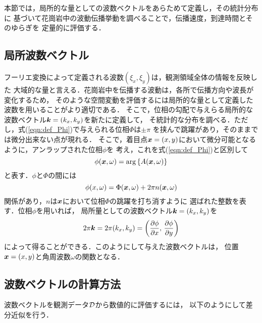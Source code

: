 ﻿本節では，局所的な量としての波数ベクトルをあらためて定義し，その統計分布に
基づいて花崗岩中の波動伝播挙動を調べることで，伝播速度，到達時間とそのゆらぎを
定量的に評価する．
\subsection{局所波数ベクトル}
フーリエ変換によって定義される波数$(\xi_x,\xi_y)$は，観測領域全体の情報を反映した
大域的な量と言える．花崗岩中を伝播する波動は，各所で伝播方向や波長が変化するため，
そのような空間変動を評価するには局所的な量として定義した波数を用いることがより適切である．
そこで，位相の勾配で与えらる局所的な波数ベクトル$\mbox{\boldmath{$k$}}=(k_x,k_y)$を新たに定義して，
そ統計的な分布を調べる．ただし，式(\ref{eqn:def_Phi})で与えられる位相$\Phi$は$\pm \pi$
を挟んで跳躍があり，そのままでは微分出来ない点が現れる．
そこで，着目点$\mbox{\boldmath{$x$}}=(x,y)$において微分可能となるように，アンラップされた位相$\phi$を
考え，これを式(\ref{eqn:def_Phi})と区別して
\begin{equation}
	\phi(\fat{x},\omega)=\arg\left\{  A(\fat{x},\omega) \right\}
	\label{eqn:def_phi}
\end{equation}
と表す．$\phi$と$\Phi$の間には
\begin{equation}
	\phi(x,\omega)=\Phi(\fat{x},\omega) + 2\pi n(\fat{x},\omega )
	\label{eqn:unwrap}
\end{equation}
関係があり，$n$は$\mbox{\boldmath{$x$}}$において位相$\Phi$の跳躍を打ち消すように
選ばれた整数を表す．位相$\phi$を用いれば，
局所量としての波数ベクトル$\mbox{\boldmath{$k$}}=(k_x,k_y)$を
\begin{equation}
	2\pi \fat{k}= 
	2\pi (k_x,k_y)=
	\left(
		\frac{\partial \phi}{\partial x}
		, \, 
		\frac{\partial \phi}{\partial y} 
	\right)
	\label{eqn:}
\end{equation}
によって得ることができる．このようにして与えた波数ベクトルは，
位置$\mbox{\boldmath{$x$}}=(x,y)$と角周波数$\omega$の関数となる．
\subsection{波数ベクトルの計算方法}
波数ベクトルを観測データ$\cal D$から数値的に評価するには，
以下のようにして差分近似を行う．

